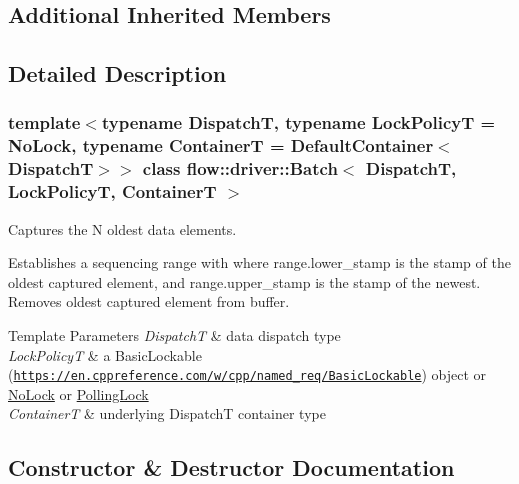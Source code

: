 \subsection*{Additional Inherited Members}


\subsection{Detailed Description}
\subsubsection*{template$<$typename DispatchT, typename Lock\+PolicyT = No\+Lock, typename ContainerT = Default\+Container$<$\+Dispatch\+T$>$$>$\newline
class flow\+::driver\+::\+Batch$<$ Dispatch\+T, Lock\+Policy\+T, Container\+T $>$}

Captures the N oldest data elements. 

Establishes a sequencing range with where {\ttfamily range.\+lower\+\_\+stamp} is the stamp of the oldest captured element, and {\ttfamily range.\+upper\+\_\+stamp} is the stamp of the newest. Removes oldest captured element from buffer.


\begin{DoxyTemplParams}{Template Parameters}
{\em DispatchT} & data dispatch type \\
\hline
{\em Lock\+PolicyT} & a Basic\+Lockable (\href{https://en.cppreference.com/w/cpp/named_req/BasicLockable}{\tt https\+://en.\+cppreference.\+com/w/cpp/named\+\_\+req/\+Basic\+Lockable}) object or \hyperlink{structflow_1_1_no_lock}{No\+Lock} or \hyperlink{structflow_1_1_polling_lock}{Polling\+Lock} \\
\hline
{\em ContainerT} & underlying {\ttfamily DispatchT} container type \\
\hline
\end{DoxyTemplParams}


\subsection{Constructor \& Destructor Documentation}
\mbox{\label{classflow_1_1driver_1_1_batch_aab925c03810bbef505446e72871127d6}} 
